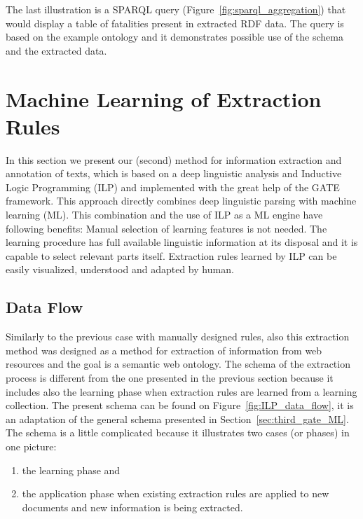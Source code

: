 The last illustration is a SPARQL query (Figure~\ref{fig:sparql_aggregation}) that would display a table of fatalities present in extracted RDF data. The query is based on the example ontology and it demonstrates possible use of the schema and the extracted data.







\section{Machine Learning of Extraction Rules} \label{sec:learning_methods} \graphicspath{{../img/ch60/}}

In this section we present %
our (second) method for information extraction and annotation of texts, which is based on a deep linguistic analysis and Inductive Logic Programming (ILP) and implemented with the great help of the GATE framework. This approach directly combines deep linguistic parsing with machine learning (ML). This combination and the use of ILP as a ML engine have following benefits: Manual selection of learning features is not needed. 
The learning procedure has full available linguistic information at its disposal and it is capable to select relevant parts itself. Extraction rules learned by ILP can be easily visualized, understood and adapted by human.


\subsection{Data Flow}


Similarly to the previous case with manually designed rules, also this extraction method was designed as a method for extraction of information from web resources and the goal is a semantic web ontology. The schema of the extraction process is different from the one presented in the previous section because it includes also the learning phase when extraction rules are learned from a learning collection. The present schema can be found on Figure~\ref{fig:ILP_data_flow}, it is an adaptation of the general schema presented in Section~\ref{sec:third_gate_ML}. The schema is a little complicated because it illustrates two cases (or phases) in one picture:
\begin{enumerate}
	\item the learning phase and
	\item the application phase when existing extraction rules are applied to new documents and new information is being extracted.
\end{enumerate}

